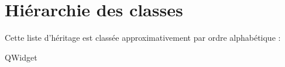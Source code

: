 \section{Hiérarchie des classes}
Cette liste d'héritage est classée approximativement par ordre alphabétique \+:\begin{DoxyCompactList}
\item Q\+Widget\begin{DoxyCompactList}
\item {}
\end{DoxyCompactList}
\end{DoxyCompactList}
